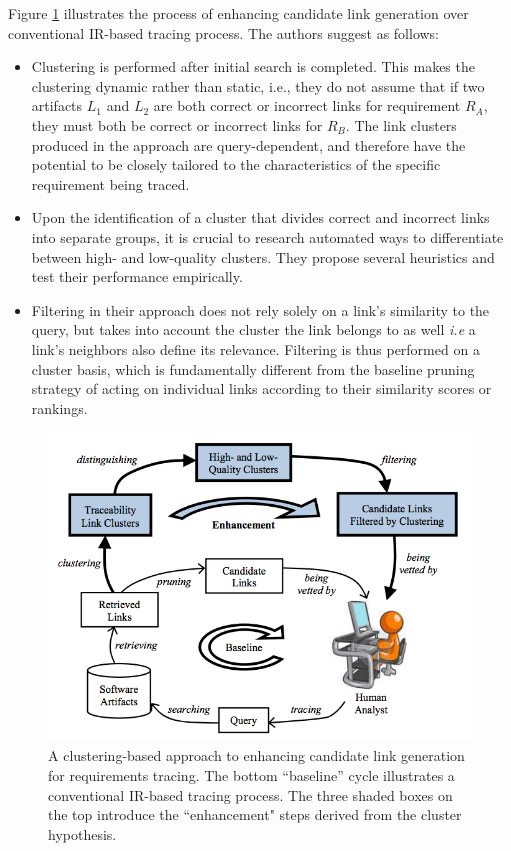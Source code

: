 \documentclass{report}
\begin{document}
Figure \ref{fig:clustering} illustrates the process of enhancing candidate link generation over
conventional IR-based tracing process. The authors suggest as follows:
\begin{itemize}
\item Clustering is performed after initial search is completed.
This makes the clustering dynamic rather than
static, i.e., they do not assume that if two artifacts $L_1$ and
$L_2$ are both correct or incorrect links for requirement
$R_A$, they must both be correct or incorrect links for
$R_B$. The link clusters produced in the approach are
query-dependent, and therefore have the potential to be 
closely tailored to the characteristics of the specific
requirement being traced.
\item Upon the identification of a cluster that divides correct
and incorrect links into separate groups, it is crucial
to research automated ways to differentiate between
high- and low-quality clusters. They propose several
heuristics and test their performance empirically.
\item Filtering in their approach does not rely solely on a link's
similarity to the query, but takes into account the cluster
the link belongs to as well \textit{i.e} a link's
neighbors also define its relevance. Filtering is thus
performed on a cluster basis, which is fundamentally
different from the baseline pruning strategy of acting
on individual links according to their similarity scores
or rankings.
\end{itemize}

\begin{figure}
\centering
\includegraphics[scale=0.7]{img/clustering}
\caption{A clustering-based approach to enhancing candidate link
generation for requirements tracing. The bottom “baseline” cycle illustrates
a conventional IR-based tracing process. The three shaded boxes on the top
introduce the ``enhancement" steps derived from the cluster hypothesis.}
\label{fig:clustering}
\end{figure}
\end{document}
